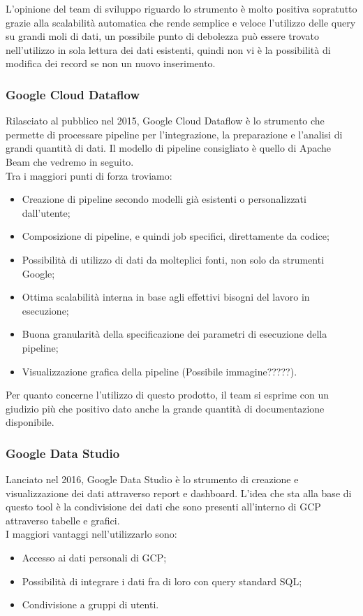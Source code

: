 L'opinione del team di sviluppo riguardo lo strumento è molto positiva sopratutto grazie alla scalabilità automatica che rende semplice e veloce l'utilizzo delle query su grandi moli di dati, un possibile punto di debolezza può essere trovato nell'utilizzo in sola lettura dei dati esistenti, quindi non vi è la possibilità di modifica dei record se non un nuovo inserimento.
\subsubsection{Google Cloud Dataflow}
Rilasciato al pubblico nel 2015, Google Cloud Dataflow \cite{GoogleCloudDataflow} è lo strumento che permette di processare pipeline per l'integrazione, la preparazione e l'analisi di grandi quantità di dati.
Il modello di pipeline consigliato è quello di Apache Beam che vedremo in seguito.
\\ Tra i maggiori punti di forza troviamo:
\begin{itemize}
	\item Creazione di pipeline secondo modelli già esistenti o personalizzati dall'utente;
	\item Composizione di pipeline, e quindi job specifici, direttamente da codice;
	\item Possibilità di utilizzo di dati da molteplici fonti, non solo da strumenti Google;
	\item Ottima scalabilità interna in base agli effettivi bisogni del lavoro in esecuzione;
	\item Buona granularità della specificazione dei parametri di esecuzione\cite{parametridiesecuzione} della pipeline;
	\item Visualizzazione grafica della pipeline (Possibile immagine?????). 
\end{itemize}
Per quanto concerne l'utilizzo di questo prodotto, il team si esprime con un giudizio più che positivo dato anche la grande quantità di documentazione disponibile.
\subsubsection{Google Data Studio}
Lanciato nel 2016, Google Data Studio\cite{GoogleDataStudio} è lo strumento di creazione e visualizzazione dei dati attraverso report e dashboard. L'idea che sta alla base di questo tool è la condivisione dei dati che sono presenti all'interno di GCP attraverso tabelle e grafici.
\\ I maggiori vantaggi nell'utilizzarlo sono:
\begin{itemize}
	\item Accesso ai dati personali di GCP;
	\item Possibilità di integrare i dati fra di loro con query standard SQL;
	\item Condivisione a gruppi di utenti. 
\end{itemize}

